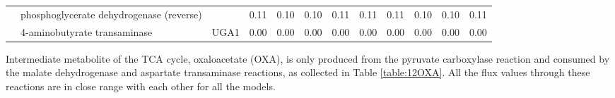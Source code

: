 \begin{table}[H]
{\begin{tabular}{|clcccccccccc|}
                        & phosphoglycerate dehydrogenase (reverse)                                                      &                                                           & 0.11      & 0.10      & 0.10     & 0.11                                                          & 0.11 & 0.11   & 0.10                                                      & 0.10   & 0.11     \\
                        & 4-aminobutyrate transaminase                                                                  & UGA1                                                    & 0.00      & 0.00      & 0.00     & 0.00                                                          & 0.00 & 0.00   & 0.00                                                      & 0.00   & 0.00     \\ \hline
\end{tabular}}
\label{table:122KG}
\end{table}

Intermediate metabolite of the TCA cycle, oxaloacetate (OXA), is only produced from the pyruvate carboxylase reaction and consumed by the malate dehydrogenase and aspartate transaminase reactions, as collected in Table \ref{table:12OXA}. All the flux values through these reactions are in close range with each other for all the models.

